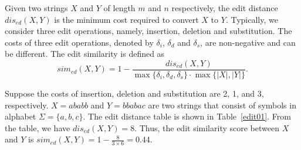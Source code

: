 \begin{definition}\label{def:edit-gen}
Given two strings $X$ and $Y$ of length $m$ and $n$ respectively, the edit distance $dis_{ed}(X, Y)$ is the minimum cost required to convert $X$ to $Y$. Typically, we consider three edit operations, namely, insertion, deletion and substitution. The costs of three edit operations, denoted by $\delta_i$, $\delta_d$ and $\delta_s$, are non-negative and can be different. The edit similarity is defined as $$sim_{ed}(X, Y) = 1 - \frac{dis_{ed}(X, Y)}{\max\{\delta_i, \delta_d, \delta_s\}\cdot \max\{|X|, |Y|\}}.$$
\end{definition}

\begin{example}\label{example:comp-edit}
Suppose the costs of insertion, deletion and substitution are 2, 1, and 3, respectively. $X = ababb$ and $Y = bbabac$ are two strings that consist of symbols in alphabet $\Sigma=\{a, b, c\}$. The edit distance table is shown in Table~\ref{edit01}. From the table, we have $dis_{ed}(X, Y) = 8$. Thus, the edit similarity score between $X$ and $Y$ is $sim_{ed}(X, Y) = 1- \frac{8}{3\times 6} = 0.44$.
\end{example}

\begin{table}[tb]
\caption{Edit distance tables for Example~\ref{example:comp-edit} and Example~\ref{example:bound-ed}}
\label{ed-comp}
\centering
{}
\quad
{}

\end{table}


